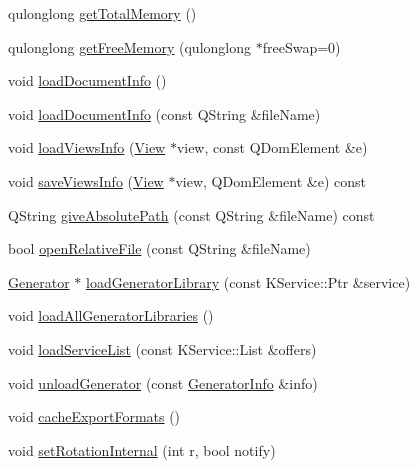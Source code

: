 \begin{DoxyCompactItemize}
\item 
qulonglong \hyperlink{classOkular_1_1DocumentPrivate_a612b0f725408b5949bb5856d18e62ba8}{get\+Total\+Memory} ()
\item 
qulonglong \hyperlink{classOkular_1_1DocumentPrivate_a2657e5871ed6792f7061f29fb14b54bf}{get\+Free\+Memory} (qulonglong $\ast$free\+Swap=0)
\item 
void \hyperlink{classOkular_1_1DocumentPrivate_ab3b82ad8d5fbe55c02af3b21a9e2459e}{load\+Document\+Info} ()
\item 
void \hyperlink{classOkular_1_1DocumentPrivate_ad3a13740550ff7c32077f909b8184ed0}{load\+Document\+Info} (const Q\+String \&file\+Name)
\item 
void \hyperlink{classOkular_1_1DocumentPrivate_a3cd7a844dbd51a7da80f93ea2aa9cf22}{load\+Views\+Info} (\hyperlink{classOkular_1_1View}{View} $\ast$view, const Q\+Dom\+Element \&e)
\item 
void \hyperlink{classOkular_1_1DocumentPrivate_a26f0a9bd5feee1f235eca1defee29482}{save\+Views\+Info} (\hyperlink{classOkular_1_1View}{View} $\ast$view, Q\+Dom\+Element \&e) const 
\item 
Q\+String \hyperlink{classOkular_1_1DocumentPrivate_a1c665a65d08f7b032bba757b298e26a6}{give\+Absolute\+Path} (const Q\+String \&file\+Name) const 
\item 
bool \hyperlink{classOkular_1_1DocumentPrivate_a4853d128c2eb810795bf2cd4ca3665e2}{open\+Relative\+File} (const Q\+String \&file\+Name)
\item 
\hyperlink{classOkular_1_1Generator}{Generator} $\ast$ \hyperlink{classOkular_1_1DocumentPrivate_ac7c902ff8d869394318ffe7b28ff1336}{load\+Generator\+Library} (const K\+Service\+::\+Ptr \&service)
\item 
void \hyperlink{classOkular_1_1DocumentPrivate_a28aafc3875578bfd4065d465e1c96cc4}{load\+All\+Generator\+Libraries} ()
\item 
void \hyperlink{classOkular_1_1DocumentPrivate_aff87ea26b538d2653644a394c3909271}{load\+Service\+List} (const K\+Service\+::\+List \&offers)
\item 
void \hyperlink{classOkular_1_1DocumentPrivate_a499afa495dece15b37a7df356c178805}{unload\+Generator} (const \hyperlink{structGeneratorInfo}{Generator\+Info} \&info)
\item 
void \hyperlink{classOkular_1_1DocumentPrivate_a0319ccf7bd247df318608af697c244b3}{cache\+Export\+Formats} ()
\item 
void \hyperlink{classOkular_1_1DocumentPrivate_aceccc21fbf3022c439eb011a452a06fa}{set\+Rotation\+Internal} (int r, bool notify)

\end{DoxyCompactItemize}
